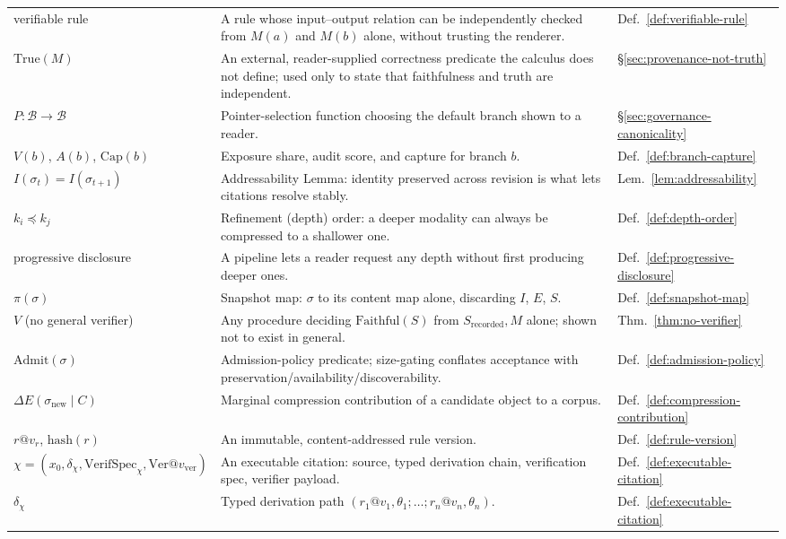 \documentclass[11pt]{article}
\theoremstyle{definition}
\begin{document}
\begin{longtable}{@{}p{}p{}p{}@{}}
verifiable rule & A rule whose input--output relation can be independently checked from $M(a)$ and $M(b)$ alone, without trusting the renderer. & Def.~\ref{def:verifiable-rule} \\
$\mathrm{True}(M)$ & An external, reader-supplied correctness predicate the calculus does not define; used only to state that faithfulness and truth are independent. & \S\ref{sec:provenance-not-truth} \\
$P : \mathcal{B} \to \mathcal{B}$ & Pointer-selection function choosing the default branch shown to a reader. & \S\ref{sec:governance-canonicality} \\
$V(b)$, $A(b)$, $\mathrm{Cap}(b)$ & Exposure share, audit score, and capture for branch $b$. & Def.~\ref{def:branch-capture} \\
$I(\sigma_t) = I(\sigma_{t+1})$ & Addressability Lemma: identity preserved across revision is what lets citations resolve stably. & Lem.~\ref{lem:addressability} \\
$k_i \preceq k_j$ & Refinement (depth) order: a deeper modality can always be compressed to a shallower one. & Def.~\ref{def:depth-order} \\
progressive disclosure & A pipeline lets a reader request any depth without first producing deeper ones. & Def.~\ref{def:progressive-disclosure} \\
$\pi(\sigma)$ & Snapshot map: $\sigma$ to its content map alone, discarding $I$, $E$, $S$. & Def.~\ref{def:snapshot-map} \\
$V$ (no general verifier) & Any procedure deciding $\mathrm{Faithful}(S)$ from $S_{\mathrm{recorded}}, M$ alone; shown not to exist in general. & Thm.~\ref{thm:no-verifier} \\
$\mathrm{Admit}(\sigma)$ & Admission-policy predicate; size-gating conflates acceptance with preservation/availability/discoverability. & Def.~\ref{def:admission-policy} \\
$\Delta E(\sigma_{\mathrm{new}} \mid C)$ & Marginal compression contribution of a candidate object to a corpus. & Def.~\ref{def:compression-contribution} \\
$r@v_r$, $\mathrm{hash}(r)$ & An immutable, content-addressed rule version. & Def.~\ref{def:rule-version} \\
$\chi = (x_0,\delta_\chi,\mathrm{VerifSpec}_\chi,\mathrm{Ver}@v_{\mathrm{ver}})$ & An executable citation: source, typed derivation chain, verification spec, verifier payload. & Def.~\ref{def:executable-citation} \\
$\delta_\chi$ & Typed derivation path $(r_1@v_1,\theta_1;\ldots;r_n@v_n,\theta_n)$. & Def.~\ref{def:executable-citation} \\

\end{longtable}
\end{document}
